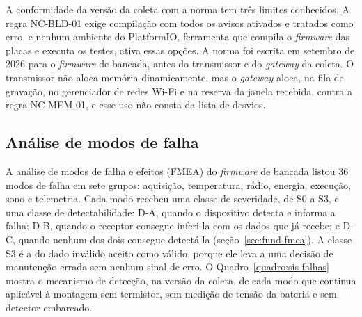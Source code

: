 A conformidade da versão da coleta com a norma tem três limites conhecidos. A regra NC-BLD-01 exige compilação com todos os avisos ativados e tratados como erro, e nenhum ambiente do PlatformIO, ferramenta que compila o \textit{firmware} das placas e executa os testes, ativa essas opções. A norma foi escrita em setembro de 2026 para o \textit{firmware} de bancada, antes do transmissor e do \textit{gateway} da coleta. O transmissor não aloca memória dinamicamente, mas o \textit{gateway} aloca, na fila de gravação, no gerenciador de redes Wi-Fi e na reserva da janela recebida, contra a regra NC-MEM-01, e esse uso não consta da lista de desvios.

\subsection{Análise de modos de falha}\label{sec:sis-falhas}

A análise de modos de falha e efeitos (FMEA) do \textit{firmware} de bancada listou \num{36} modos de falha em sete grupos: aquisição, temperatura, rádio, energia, execução, sono e telemetria. Cada modo recebeu uma classe de severidade, de S0 a S3, e uma classe de detectabilidade: D-A, quando o dispositivo detecta e informa a falha; D-B, quando o receptor consegue inferi-la com os dados que já recebe; e D-C, quando nenhum dos dois consegue detectá-la (seção~\ref{sec:fund-fmea}). A classe S3 é a do dado inválido aceito como válido, porque ele leva a uma decisão de manutenção errada sem nenhum sinal de erro. O Quadro~\ref{quadro:sis-falhas} mostra o mecanismo de detecção, na versão da coleta, de cada modo que continua aplicável à montagem sem termistor, sem medição de tensão da bateria e sem detector embarcado.

